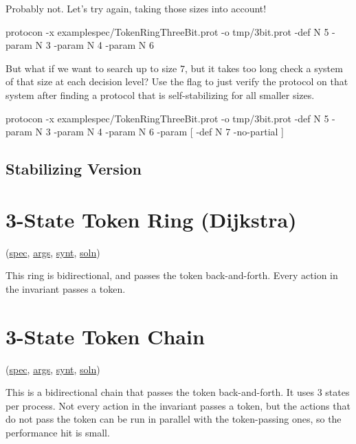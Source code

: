 Probably not.
Let's try again, taking those sizes into account!
\begin{code}
protocon -x examplespec/TokenRingThreeBit.prot -o tmp/3bit.prot -def N 5 -param N 3 -param N 4 -param N 6
\end{code}

But what if we want to search up to size $7$, but it takes too long check a system of that size at each decision level?
Use the  flag to just verify the protocol on that system after finding a protocol that is self-stabilizing for all smaller sizes.
\begin{code}
protocon -x examplespec/TokenRingThreeBit.prot -o tmp/3bit.prot -def N 5 -param N 3 -param N 4 -param N 6 -param [ -def N 7 -no-partial ]
\end{code}

\subsection{Stabilizing Version}


\section{3-State Token Ring (Dijkstra)}
\label{sec:TokenRingThreeState}

(\href{\examplespec/TokenRingThreeState.prot}{spec},
\href{\examplesett/TokenRingThreeState.args}{args},
\href{\examplesynt/TokenRingThreeState.prot}{synt},
\href{\examplesoln/TokenRingThreeState.prot}{soln})

This ring is bidirectional, and passes the token back-and-forth.
Every action in the invariant passes a token.

\section{3-State Token Chain}
\label{sec:TokenChainThreeState}

(\href{\examplespec/TokenChain.prot}{spec},
\href{\examplesett/TokenChainThreeState.args}{args},
\href{\examplesynt/TokenChain.prot}{synt},
\href{\examplesoln/TokenChainThreeState.prot}{soln})

This is a bidirectional chain that passes the token back-and-forth.
It uses 3 states per process.
Not every action in the invariant passes a token, but the actions that do not pass the token can be run in parallel with the token-passing ones, so the performance hit is small.


